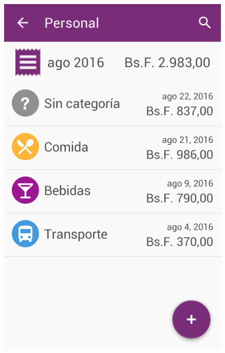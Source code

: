 \begin{figure}[ht]
\centering
\begin{minipage}{.5\textwidth}
  \centering
  \includegraphics[scale=0.45,type=png,ext=.png,read=.png]{imagenes/expenses_list}
  \captionsetup{justification=centering}
  \label{fig:interfazListarExpenses}
\end{minipage}%
\begin{minipage}{.5\textwidth}
\centering

\end{minipage}
\end{figure}
